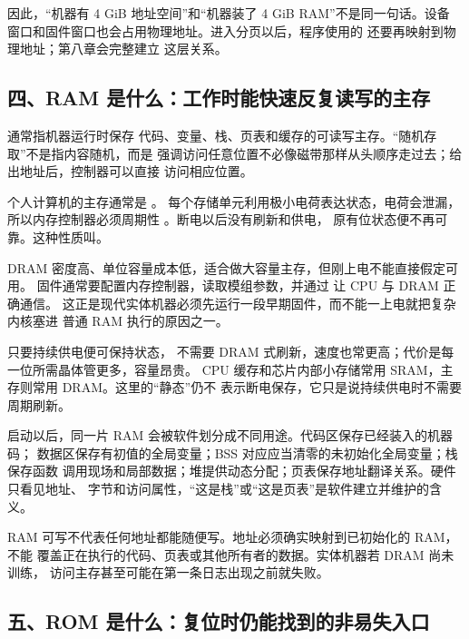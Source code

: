 因此，“机器有 4 GiB 地址空间”和“机器装了 4 GiB RAM”不是同一句话。设备
窗口和固件窗口也会占用物理地址。进入分页以后，程序使用的
还要再映射到物理地址；第八章会完整建立
这层关系。

\subsection{四、RAM 是什么：工作时能快速反复读写的主存}

通常指机器运行时保存
代码、变量、栈、页表和缓存的可读写主存。“随机存取”不是指内容随机，而是
强调访问任意位置不必像磁带那样从头顺序走过去；给出地址后，控制器可以直接
访问相应位置。

%
个人计算机的主存通常是 。
每个存储单元利用极小电荷表达状态，电荷会泄漏，所以内存控制器必须周期性
。断电以后没有刷新和供电，
原有位状态便不再可靠。这种性质叫。

DRAM 密度高、单位容量成本低，适合做大容量主存，但刚上电不能直接假定可用。
固件通常要配置内存控制器，读取模组参数，并通过
让 CPU 与 DRAM 正确通信。
这正是现代实体机器必须先运行一段早期固件，而不能一上电就把复杂内核塞进
普通 RAM 执行的原因之一。

%
只要持续供电便可保持状态，
不需要 DRAM 式刷新，速度也常更高；代价是每一位所需晶体管更多，容量昂贵。
CPU 缓存和芯片内部小存储常用 SRAM，主存则常用 DRAM。这里的“静态”仍不
表示断电保存，它只是说持续供电时不需要周期刷新。

%
启动以后，同一片 RAM 会被软件划分成不同用途。代码区保存已经装入的机器码；
数据区保存有初值的全局变量；BSS 对应应当清零的未初始化全局变量；栈保存函数
调用现场和局部数据；堆提供动态分配；页表保存地址翻译关系。硬件只看见地址、
字节和访问属性，“这是栈”或“这是页表”是软件建立并维护的含义。

\begin{failurebox}
RAM 可写不代表任何地址都能随便写。地址必须确实映射到已初始化的 RAM，不能
覆盖正在执行的代码、页表或其他所有者的数据。实体机器若 DRAM 尚未训练，
访问主存甚至可能在第一条日志出现之前就失败。
\end{failurebox}

\subsection{五、ROM 是什么：复位时仍能找到的非易失入口}

